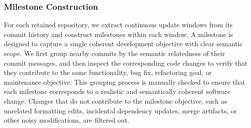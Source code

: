 \documentclass{article}
\begin{document}
\begin{table}[t]
\centering
\small
{}
\caption{Repository and domain coverage of SWE-Chain-Evo. Repository domains are assigned using a single primary label for dataset characterization.}
\label{tab:swe_chain_domains}
\end{table}

\subsubsection{Milestone Construction}
\label{app:swe_milestone_construction}
For each retained repository, we extract continuous update windows from its commit history and construct milestones within each window. A milestone is designed to capture a single coherent development objective with clear semantic scope. We first group nearby commits by the semantic relatedness of their commit messages, and then inspect the corresponding code changes to verify that they contribute to the same functionality, bug fix, refactoring goal, or maintenance objective. This grouping process is manually checked to ensure that each milestone corresponds to a realistic and semantically coherent software change. Changes that do not contribute to the milestone objective, such as unrelated formatting edits, incidental dependency updates, merge artifacts, or other noisy modifications, are filtered out.
\end{document}
